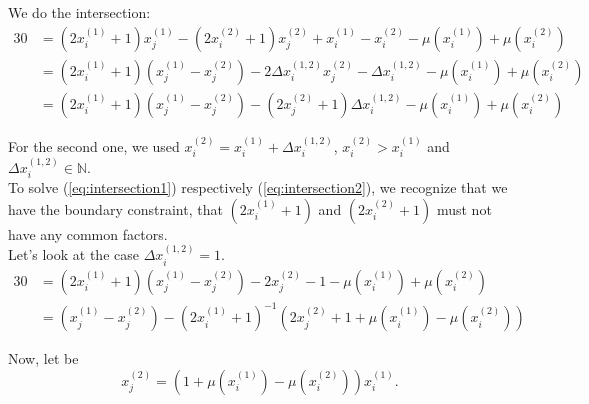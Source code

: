 We do the intersection:
\begin{alignat}{3}
	0 &= \left(2x_{i}^{\left(1\right)} + 1\right)x_{j}^{\left(1\right)} - \left(2x_{i}^{\left(2\right)} + 1\right)x_{j}^{\left(2\right)} + x_{i}^{\left(1\right)} - x_{i}^{\left(2\right)} - \mu\left(x_{i}^{\left(1\right)}\right) + \mu\left(x_{i}^{\left(2\right)}\right) \label{eq:intersection1} \\
	 &= \left(2x_{i}^{\left(1\right)} + 1\right)\left(x_{j}^{\left(1\right)} - x_{j}^{\left(2\right)}\right) - 2\Delta x_{i}^{\left(1,2\right)} x_{j}^{\left(2\right)} - \Delta x_{i}^{\left(1,2\right)} - \mu\left(x_{i}^{\left(1\right)}\right) + \mu\left(x_{i}^{\left(2\right)}\right)\label{eq:intersection2} \\
	 &= \left(2x_{i}^{\left(1\right)} + 1\right)\left(x_{j}^{\left(1\right)} - x_{j}^{\left(2\right)}\right) - \left(2x_{j}^{\left(2\right)} + 1\right)\Delta x_{i}^{\left(1,2\right)} - \mu\left(x_{i}^{\left(1\right)}\right) + \mu\left(x_{i}^{\left(2\right)}\right) \label{eq:intersection3}
\end{alignat}

For the second one, we used $x_{i}^{\left(2\right)} = x_{i}^{\left(1\right)} + \Delta x_{i}^{\left(1,2\right)}$, $x_{i}^{\left(2\right)} > x_{i}^{\left(1\right)}$ and $\Delta x_{i}^{\left(1,2\right)} \in \mathbb{N}$.\\
To solve (\ref{eq:intersection1}) respectively (\ref{eq:intersection2}), we recognize that we have the boundary constraint, that $\left(2x_{i}^{\left(1\right)} + 1\right)$ and $\left(2x_{i}^{\left(2\right)} + 1\right)$ must not have any common factors.\\

Let's look at the case $\Delta x_{i}^{\left(1,2\right)} = 1$.
\begin{alignat}{3}
	0 &= \left(2x_{i}^{\left(1\right)} + 1\right)\left(x_{j}^{\left(1\right)} - x_{j}^{\left(2\right)}\right) - 2x_{j}^{\left(2\right)} - 1 - \mu\left(x_{i}^{\left(1\right)}\right) + \mu\left(x_{i}^{\left(2\right)}\right)\label{eq:intersection2_caseDeltax1} \\
	 &= \left(x_{j}^{\left(1\right)} - x_{j}^{\left(2\right)}\right) - \left(2x_{i}^{\left(1\right)} + 1\right)^{-1} \left(2x_{j}^{\left(2\right)} + 1 + \mu\left(x_{i}^{\left(1\right)} \right) - \mu\left(x_{i}^{\left(2\right)}\right)\right) \label{eq:intersection2_caseDeltax1_s1}
\end{alignat}

Now, let be 
\begin{equation}
	x_{j}^{\left(2\right)} = \left(1 + \mu\left(x_{i}^{\left(1\right)}\right) - \mu\left(x_{i}^{\left(2\right)}\right)\right)x_{i}^{\left(1\right)}.
\label{eq:solxj2delta1}
\end{equation}

